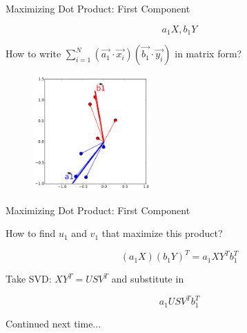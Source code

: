 \documentclass{beamer}
\begin{document}
\begin{frame}{Maximizing Dot Product: First Component}

\[a_1 X, b_1 Y \]

How to write $\sum_{i=1}^N (\vec{a_1} \cdot \vec{x_i})(\vec{b_1} \cdot \vec{y_i})$ in matrix form?


\begin{figure}[t]
	\centering
    \includegraphics[width=0.4\textwidth]{2DProcrustesProj2.pdf}
\end{figure}


\end{frame}


\begin{frame}{Maximizing Dot Product: First Component}

How to find $u_1$ and $v_1$ that maximize this product?

\[  (a_1 X) (b_1 Y)^T = a_1 X Y^T b_1^T \]

Take SVD: $XY^T = USV^T$ and substitute in

\[ a_1 U S V^T b_1^T \]


\end{frame}

\begin{frame}

Continued next time...

\end{frame}
\end{document}
